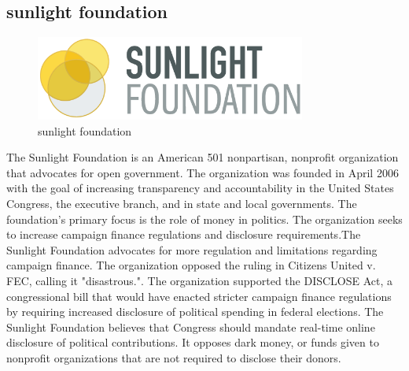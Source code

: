 \documentclass[conference]{IEEEtran}
\begin{document}
\subsection{sunlight foundation}
  \begin{figure}[htbp]
    \centerline{\includegraphics[width=89mm, scale=0.5]{fig/sunlight_foundation.png}}
    \caption{sunlight foundation}
    \label{fig}
    \end{figure}
The Sunlight Foundation is an American 501 nonpartisan, nonprofit organization that advocates for open government. The organization was founded in April 2006 with the goal of increasing transparency and accountability in the United States Congress, the executive branch, and in state and local governments. The foundation's primary focus is the role of money in politics. The organization seeks to increase campaign finance regulations and disclosure requirements.The Sunlight Foundation advocates for more regulation and limitations regarding campaign finance. The organization opposed the ruling in Citizens United v. FEC, calling it "disastrous.". The organization supported the DISCLOSE Act, a congressional bill that would have enacted stricter campaign finance regulations by requiring increased disclosure of political spending in federal elections. The Sunlight Foundation believes that Congress should mandate real-time online disclosure of political contributions. It opposes dark money, or funds given to nonprofit organizations that are not required to disclose their donors.
\\
 \vspace{25mm}
\end{document}

